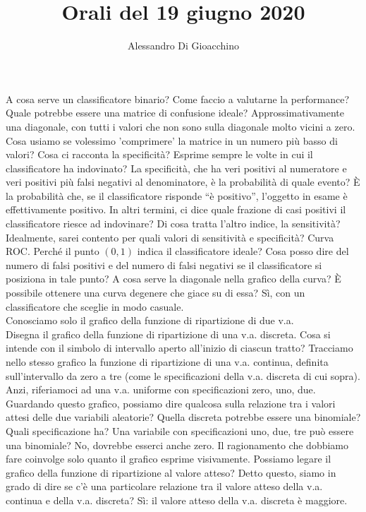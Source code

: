 \documentclass{article}
\title{Orali del 19 giugno 2020}
\author{Alessandro Di Gioacchino}
\begin{document}
    \maketitle

    A cosa serve un classificatore binario? Come faccio a valutarne la performance? Quale potrebbe essere una matrice di confusione ideale? Approssimativamente una diagonale, con
    tutti i valori che non sono sulla diagonale molto vicini a zero. Cosa usiamo se volessimo 'comprimere' la matrice in un numero più basso di valori? Cosa ci racconta la
    specificità? Esprime sempre le volte in cui il classificatore ha indovinato? La specificità, che ha veri positivi al numeratore e veri positivi più falsi negativi al
    denominatore, è la probabilità di quale evento? È la probabilità che, se il classificatore risponde “è positivo”, l'oggetto in esame è effettivamente positivo. In altri 
    termini, ci dice quale frazione di casi positivi il classificatore riesce ad indovinare? Di cosa tratta l'altro indice, la sensitività? Idealmente, sarei contento per quali
    valori di sensitività e specificità? Curva ROC. Perché il punto $ ( 0 , 1 ) $ indica il classificatore ideale? Cosa posso dire del numero di falsi positivi e del numero di
    falsi negativi se il classificatore si posiziona in tale punto? A cosa serve la diagonale nella grafico della curva? È possibile ottenere una curva degenere che giace su di
    essa? Sì, con un classificatore che sceglie in modo casuale. \\
    Conosciamo solo il grafico della funzione di ripartizione di due v.a. \\
    Disegna il grafico della funzione di ripartizione di una v.a. discreta. Cosa si intende con il simbolo di intervallo aperto all'inizio di ciascun tratto? Tracciamo nello stesso
    grafico la funzione di ripartizione di una v.a. continua, definita sull'intervallo da zero a tre (come le specificazioni della v.a. discreta di cui sopra). Anzi, riferiamoci ad
    una v.a. uniforme con specificazioni zero, uno, due. Guardando questo grafico, possiamo dire qualcosa sulla relazione tra i valori attesi delle due variabili aleatorie? Quella
    discreta potrebbe essere una binomiale? Quali specificazione ha? Una variabile con specificazioni uno, due, tre può essere una binomiale? No, dovrebbe esserci anche zero. Il
    ragionamento che dobbiamo fare coinvolge solo quanto il grafico esprime visivamente. Possiamo legare il grafico della funzione di ripartizione al valore atteso? Detto questo,
    siamo in grado di dire se c'è una particolare relazione tra il valore atteso della v.a. continua e della v.a. discreta? Sì: il valore atteso della v.a. discreta è maggiore. \\
\end{document}
